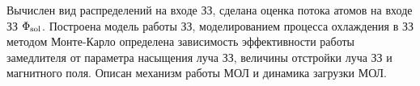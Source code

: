 Вычислен вид распределений на входе ЗЗ, сделана оценка потока атомов на входе ЗЗ $\Phi_{\textnormal{sol}}$. Построена модель работы ЗЗ, моделированием процесса охлаждения в ЗЗ методом Монте-Карло определена зависимость эффективности работы замедлителя от параметра насыщения луча ЗЗ, величины отстройки луча ЗЗ и магнитного поля. Описан механизм работы МОЛ и динамика загрузки МОЛ. 